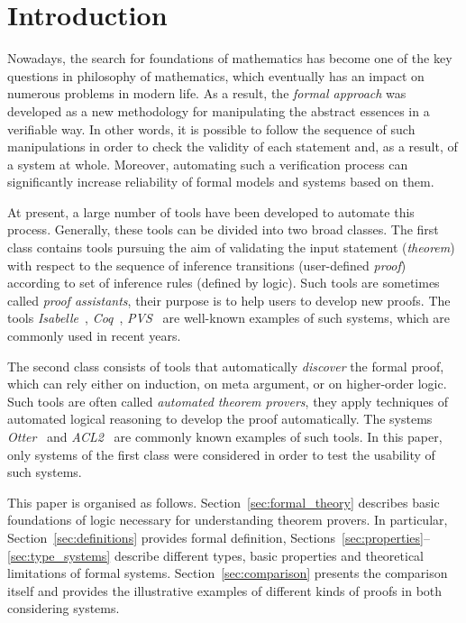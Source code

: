 \documentclass[article]{aaltoseries}
\begin{document}
\section{Introduction}
\label{sec:introduction}

Nowadays, the search for foundations of mathematics has become one of the key questions in philosophy of mathematics, which eventually has an impact on numerous problems in modern life. As a result, the \textit{formal approach} was developed as a new methodology for manipulating the abstract essences in a verifiable way. In other words, it is possible to follow the sequence of such manipulations in order to check the validity of each statement and, as a result, of a system at whole. Moreover, automating such a verification process can significantly increase reliability of formal models and systems based on them.

At present, a large number of tools have been developed to automate this process. Generally, these tools can be divided into two broad classes. 
The first class contains tools pursuing the aim of validating the input statement (\textit{theorem}) with respect to the sequence of inference transitions (user-defined \textit{proof}) according to set of inference rules (defined by logic). Such tools are sometimes called \textit{proof assistants}, their purpose is to help users to develop new proofs. The tools \textit{Isabelle}~\cite{tool_Isabelle}, \textit{Coq}~\cite{tool_Coq}, \textit{PVS}~\cite{tool_Pvs} are well-known examples of such systems, which are commonly used in recent years.

The second class consists of tools that automatically \textit{discover} the formal proof, which can rely either on induction, on meta argument, or on higher-order logic. Such tools are often called \textit{automated theorem provers}, they apply techniques of automated logical reasoning to develop the proof automatically. The systems \textit{Otter}~\cite{tool_Otter} and \textit{ACL2}~\cite{tool_Acl} are commonly known examples of such tools.
In this paper, only systems of the first class were considered in order to test the usability of such systems.

This paper is organised as follows. Section~\ref{sec:formal_theory} describes basic foundations of logic necessary for understanding theorem provers. In particular, Section~\ref{sec:definitions} provides formal definition, Sections~\ref{sec:properties}--\ref{sec:type_systems} describe different types, basic properties and theoretical limitations of formal systems.
Section~\ref{sec:comparison} presents the comparison itself and provides the illustrative examples of different kinds of proofs in both considering systems.
\end{document}
